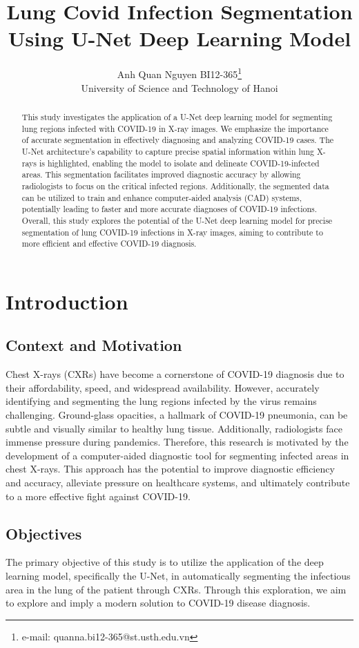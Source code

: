 \documentclass[]{acmsiggraph}
\title{Lung Covid Infection Segmentation Using U-Net Deep Learning Model}
\author{Anh Quan Nguyen BI12-365\thanks{e-mail: quanna.bi12-365@st.usth.edu.vn}\\University of Science and Technology of Hanoi}
\begin{document}
\maketitle


\begin{abstract}
This study investigates the application of a U-Net deep learning model for segmenting lung regions infected with COVID-19 in X-ray images. We emphasize the importance of accurate segmentation in effectively diagnosing and analyzing COVID-19 cases. The U-Net architecture's capability to capture precise spatial information within lung X-rays is highlighted, enabling the model to isolate and delineate COVID-19-infected areas. This segmentation facilitates improved diagnostic accuracy by allowing radiologists to focus on the critical infected regions. Additionally, the segmented data can be utilized to train and enhance computer-aided analysis (CAD) systems, potentially leading to faster and more accurate diagnoses of COVID-19 infections. Overall, this study explores the potential of the U-Net deep learning model for precise segmentation of lung COVID-19 infections in X-ray images, aiming to contribute to more efficient and effective COVID-19 diagnosis.
\end{abstract}

\section{Introduction}

\subsection{Context and Motivation}
Chest X-rays (CXRs) have become a cornerstone of COVID-19 diagnosis due to their affordability, speed, and widespread availability. However, accurately identifying and segmenting the lung regions infected by the virus remains challenging.  Ground-glass opacities, a hallmark of COVID-19 pneumonia, can be subtle and visually similar to healthy lung tissue. Additionally, radiologists face immense pressure during pandemics.  Therefore, this research is motivated by the development of a computer-aided diagnostic tool for segmenting infected areas in chest X-rays. This approach has the potential to improve diagnostic efficiency and accuracy, alleviate pressure on healthcare systems, and ultimately contribute to a more effective fight against COVID-19.

\subsection{Objectives}
The primary objective of this study is to utilize the application of the deep learning model, specifically the U-Net, in automatically segmenting the infectious area in the lung of the patient through CXRs. Through this exploration, we aim to explore and imply a modern solution to COVID-19 disease diagnosis.
\end{document}
